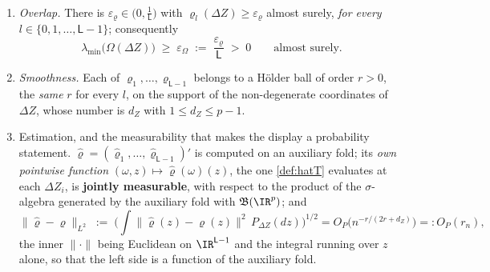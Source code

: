 \begin{assumption}\label{ass:overlap}~
\begin{enumerate}
\item[(i)] \emph{Overlap.} There is $\varepsilon_\varrho\in\big(0,\tfrac1{\mathsf L}\big)$ with
$\varrho_l(\Delta Z)\ge\varepsilon_\varrho$ almost surely, \emph{for every}
$l\in\{0,1,\dots,\mathsf L-1\}$; consequently
\begin{equation}\label{eq:omegafloor}
\lambda_{\min}\big(\Omega(\Delta Z)\big)\;\ge\;\varepsilon_\Omega\;:=\;\frac{\varepsilon_\varrho}{\mathsf L}\;>\;0
\qquad\text{almost surely.}
\end{equation}
\item[(ii)] \emph{Smoothness.} Each of $\varrho_1,\dots,\varrho_{\mathsf L-1}$ belongs to a H\"older ball
of order $r>0$, the \emph{same} $r$ for every $l$, on the support of the
non-degenerate coordinates of $\Delta Z$, whose number is $d_Z$ with $1\le d_Z\le p-1$.
\item[(iii)] Estimation, and the measurability that makes the display a probability statement.
$\hat\varrho=(\hat\varrho_1,\dots,\hat\varrho_{\mathsf L-1})'$ is computed on an auxiliary fold; its
\emph{own pointwise function}
$(\omega,z)\mapsto\hat\varrho(\omega)(z)$, the one \cref{def:hatT} evaluates at each $\Delta Z_i$, is
\textbf{jointly measurable}, with respect to the product of the $\sigma$-algebra generated by the
auxiliary fold with $\mathfrak B(\IR^{p})$; and
\[
\big\|\hat\varrho-\varrho\big\|_{L^2}
\;:=\;\Big(\int\big\|\hat\varrho(z)-\varrho(z)\big\|^{2}\,P_{\Delta Z}(dz)\Big)^{1/2}
=O_P\big(n^{-r/(2r+d_Z)}\big)=:O_P(r_n),
\]
the inner $\|\cdot\|$ being Euclidean on $\IR^{\mathsf L-1}$ and the integral running over $z$ alone, so
that the left side is a function of the auxiliary fold.
\end{enumerate}
\end{assumption}

